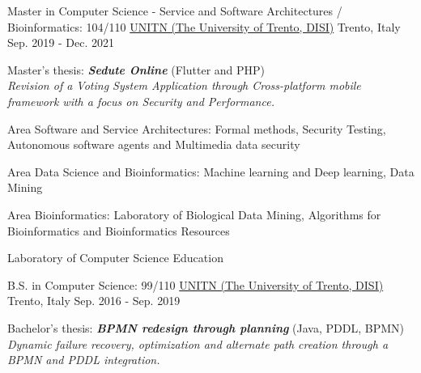 

\begin{cventries}

\cventry
{Master in Computer Science - Service and Software Architectures / Bioinformatics: 104/110} %
{\href{https://www.unitn.it/}{UNITN (The University of Trento, DISI)}}  %
{Trento, Italy} %
{Sep. 2019 - Dec. 2021} %
{
  \begin{cvitems} %
    \item {Master's thesis: \textbf{\textit{Sedute Online}} (Flutter and PHP)\\\textit{Revision of a Voting System Application through Cross-platform mobile framework with a focus on Security and Performance.}}
    \item {Area Software and Service Architectures: Formal methods, Security Testing, Autonomous software agents and Multimedia data security}
    \item {Area Data Science and Bioinformatics: Machine learning and Deep learning, Data Mining}
    \item {Area Bioinformatics: Laboratory of Biological Data Mining, Algorithms for Bioinformatics and Bioinformatics Resources}
    \item {Laboratory of Computer Science Education}
  \end{cvitems}
}

\cventry
{B.S. in Computer Science: 99/110} %
{\href{https://www.unitn.it/}{UNITN (The University of Trento, DISI)}}  %
{Trento, Italy} %
{Sep. 2016 - Sep. 2019} %
{
  \begin{cvitems} %
    \item {Bachelor's thesis: \textbf{\textit{BPMN redesign through planning}} (Java, PDDL, BPMN)\\\textit{Dynamic failure recovery, optimization and alternate path creation through a BPMN and PDDL integration.}}
  \end{cvitems}
}

\end{cventries}
